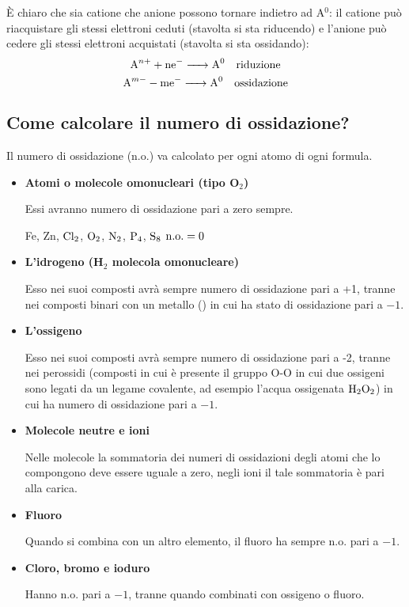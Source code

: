 È chiaro che sia catione che anione possono tornare indietro ad A$^0$: il catione può riacquistare gli stessi elettroni ceduti (stavolta si sta riducendo) e l'anione può cedere gli stessi elettroni acquistati (stavolta si sta ossidando):
$$\ce{A^{n+} + ne^- -> A^0} \quad \text{riduzione}$$
$$\ce{A^{m-} - me^- -> A^0} \quad \text{ossidazione}$$
\subsection{Come calcolare il numero di ossidazione?}
Il numero di ossidazione (n.o.) va calcolato per ogni atomo di ogni formula.

\begin{itemize}[leftmargin=0.5cm]
  \item \textbf{Atomi o molecole omonucleari (tipo O$_2$)}
  
  Essi avranno numero di ossidazione pari a zero sempre.
  \begin{center}
    Fe, Zn, $\rm Cl_2$, $\rm O_2$, $\rm N_2$, $\rm P_4$, $\rm S_8$ $\rm n.o.=0$
  \end{center}

  \item \textbf{L'idrogeno (H$_2$ molecola omonucleare)}

  Esso nei suoi composti avrà sempre numero di ossidazione pari a +1, tranne nei composti binari con un metallo () in cui ha stato di ossidazione pari a $-1$.
  \item \textbf{L'ossigeno}

  Esso nei suoi composti avrà sempre numero di ossidazione pari a -2, tranne nei perossidi (composti in cui è presente il gruppo O-O in cui due ossigeni sono legati da un legame covalente, ad esempio l'acqua ossigenata $\rm H_2O_2$) in cui ha numero di ossidazione pari a $-1$.
  \item \textbf{Molecole neutre e ioni}

  Nelle molecole la sommatoria dei numeri di ossidazioni degli atomi che lo compongono deve essere uguale a zero, negli ioni il tale sommatoria è pari alla carica.

  \item \textbf{Fluoro}

  Quando si combina con un altro elemento, il fluoro ha sempre n.o. pari a $-1$.
  \item \textbf{Cloro, bromo e ioduro}

  Hanno n.o. pari a $-1$, tranne quando combinati con ossigeno o fluoro.


\end{itemize}
